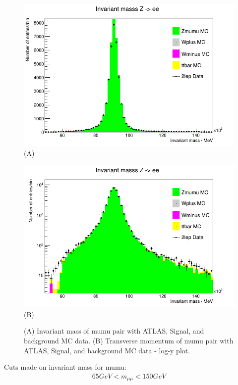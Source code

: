 \begin{figure}[h!]
    \centering
    \begin{minipage}{0.5\textwidth}
        \centering
        \includegraphics[width=\linewidth]{plots/03-03-2021/11-01_03-03-21.png}
        (A)
    \end{minipage}\hfill
    \begin{minipage}{0.5\textwidth}
        \centering
        \includegraphics[width=\linewidth]{plots/03-03-2021/11-00_03-03-21.png}
        (B)
    \end{minipage}
    \caption{(A) Invariant mass of mumu pair with ATLAS, Signal, and background MC data. (B) Transverse momentum of mumu pair with ATLAS, Signal, and background MC data - log-y plot.}
    \label{fig:11-00_03-03-21}
\end{figure}

Cuts made on invariant mass for mumu:
\begin{align}
    65 GeV < m_{\mu\mu} < 150 GeV
\end{align}


